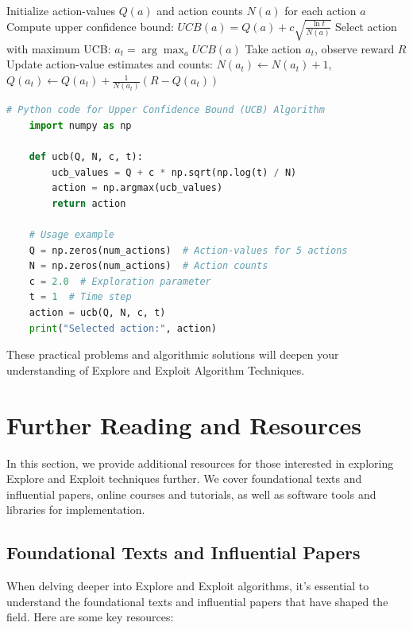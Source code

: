 \documentclass[12pt]{book} %
\begin{document}
\begin{enumerate}
    \begin{algorithm}[H]
    \caption{Upper Confidence Bound (UCB) Algorithm}
    \begin{algorithmic}[1]
    \State Initialize action-values $Q(a)$ and action counts $N(a)$ for each action $a$
            \State Compute upper confidence bound: $UCB(a) = Q(a) + c \sqrt{\frac{\ln t}{N(a)}}$
        \EndFor
        \State Select action with maximum UCB: $a_t = \arg\max_a UCB(a)$
        \State Take action $a_t$, observe reward $R$
        \State Update action-value estimates and counts: $N(a_t) \leftarrow N(a_t) + 1$, $Q(a_t) \leftarrow Q(a_t) + \frac{1}{N(a_t)}(R - Q(a_t))$
    \EndFor
    \end{algorithmic}
    \end{algorithm}
    
    \FloatBarrier
    \begin{lstlisting}[language=Python, caption=Upper Confidence Bound (UCB) Algorithm Implementation]
    # Python code for Upper Confidence Bound (UCB) Algorithm
    import numpy as np
    
    def ucb(Q, N, c, t):
        ucb_values = Q + c * np.sqrt(np.log(t) / N)
        action = np.argmax(ucb_values)
        return action
    
    # Usage example
    Q = np.zeros(num_actions)  # Action-values for 5 actions
    N = np.zeros(num_actions)  # Action counts
    c = 2.0  # Exploration parameter
    t = 1  # Time step
    action = ucb(Q, N, c, t)
    print("Selected action:", action)
    \end{lstlisting}
    \FloatBarrier
\end{enumerate}

These practical problems and algorithmic solutions will deepen your understanding of Explore and Exploit Algorithm Techniques.

\section{Further Reading and Resources}
In this section, we provide additional resources for those interested in exploring Explore and Exploit techniques further. We cover foundational texts and influential papers, online courses and tutorials, as well as software tools and libraries for implementation.

\subsection{Foundational Texts and Influential Papers}
When delving deeper into Explore and Exploit algorithms, it's essential to understand the foundational texts and influential papers that have shaped the field. Here are some key resources:
\end{document}

